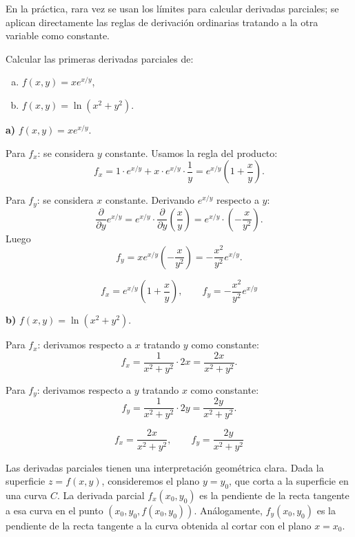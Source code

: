 \begin{rem}
En la práctica, rara vez se usan los límites para calcular derivadas
parciales; se aplican directamente las reglas de derivación
ordinarias tratando a la otra variable como constante.
\end{rem}

\begin{example}
Calcular las primeras derivadas parciales de:
\begin{enumerate}[a)]
    \item $f(x,y)=x e^{x/y}$,
    \item $f(x,y)=\ln(x^2+y^2)$.
\end{enumerate}
\end{example}

\begin{myproof}
\textbf{a)} $f(x,y)=x e^{x/y}$.

Para $f_x$: se considera $y$ constante. Usamos la regla del producto:
\[
f_x = 1\cdot e^{x/y} + x\cdot e^{x/y}\cdot \frac{1}{y}
= e^{x/y}\left(1+\frac{x}{y}\right).
\]

Para $f_y$: se considera $x$ constante. Derivando $e^{x/y}$ respecto a $y$:
\[
\frac{\partial}{\partial y} e^{x/y}
= e^{x/y}\cdot \frac{\partial}{\partial y}\left(\frac{x}{y}\right)
= e^{x/y}\cdot \left(-\frac{x}{y^2}\right).
\]
Luego
\[
f_y = x e^{x/y}\left(-\frac{x}{y^2}\right)
= -\frac{x^2}{y^2} e^{x/y}.
\]

\[
\boxed{f_x = e^{x/y}\left(1+\frac{x}{y}\right),\qquad
f_y = -\frac{x^2}{y^2}e^{x/y}}
\]

\textbf{b)} $f(x,y)=\ln(x^2+y^2)$.

Para $f_x$: derivamos respecto a $x$ tratando $y$ como constante:
\[
f_x = \frac{1}{x^2+y^2}\cdot 2x = \frac{2x}{x^2+y^2}.
\]

Para $f_y$: derivamos respecto a $y$ tratando $x$ como constante:
\[
f_y = \frac{1}{x^2+y^2}\cdot 2y = \frac{2y}{x^2+y^2}.
\]

\[
\boxed{f_x = \frac{2x}{x^2+y^2},\qquad
f_y = \frac{2y}{x^2+y^2}}
\]
\end{myproof}


Las derivadas parciales tienen una interpretación geométrica clara.
Dada la superficie $z=f(x,y)$, consideremos el plano $y=y_0$, que
corta a la superficie en una curva $C$. La derivada parcial
$f_x(x_0,y_0)$ es la pendiente de la recta tangente a esa curva en
el punto $(x_0,y_0,f(x_0,y_0))$. Análogamente, $f_y(x_0,y_0)$ es la
pendiente de la recta tangente a la curva obtenida al cortar con el
plano $x=x_0$.


